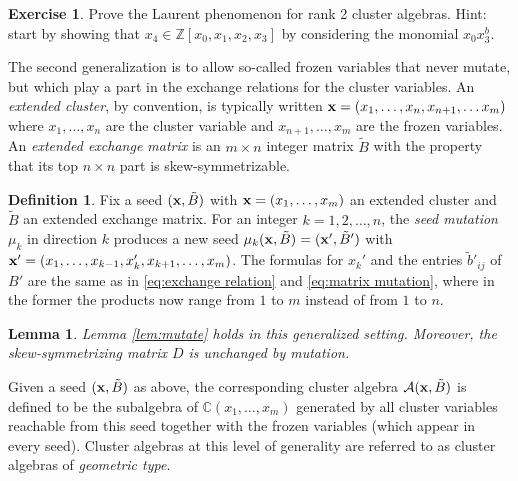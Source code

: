 \documentclass{amsart}
\newtheorem{lemma}[theorem]{Lemma}
\theoremstyle{definition}
\newtheorem{definition}[theorem]{Definition}
\newtheorem{exercise}[theorem]{Exercise}
\theoremstyle{remark}
\numberwithin{equation}{section}
\newcommand{\cA}{{\mathcal{A}}}
\newcommand{\x}{{\bf x}}
\newcommand{\CC}{{\mathbb{C}}}
\newcommand{\ZZ}{{\mathbb{Z}}}
\begin{document}
	\begin{exercise}
    Prove the Laurent phenomenon for rank 2 cluster algebras.  Hint: start by showing that $x_4\in\ZZ[x_0,x_1,x_2,x_3]$ by considering the monomial $x_0x_3^b$.
  \end{exercise}
	
	The second generalization is to allow so-called frozen variables that never mutate, but which play a part in the exchange relations for the cluster variables. An \emph{extended cluster}, by convention, is typically written $\x = (x_1,\ldots, x_n, x_{n+1},\ldots x_m)$ where $x_1,\ldots, x_n$ are the cluster variable and $x_{n+1},\ldots, x_m$ are the frozen variables.  An \emph{extended exchange matrix} is an $m \times n$ integer matrix $\tilde{B}$ with the property that its top $n \times n$ part is skew-symmetrizable.
	
	\begin{definition}
	Fix a seed $(\x, \tilde B)$ with $\x=(x_1,\ldots, x_m)$ an extended cluster and $\tilde{B}$ an extended exchange matrix.  For an integer $k = 1,2,\ldots, n$, the \emph{seed mutation} $\mu_k$ in direction $k$ produces a new seed $\mu_k(\x,\tilde{B}) = (\x',\tilde{B}')$ with $\x' = (x_1,\ldots, x_{k-1}, x_k', x_{k+1},\ldots, x_m)$.  The formulas for $x_k'$ and the entries $\tilde{b}'_{ij}$ of $B'$ are the same as in \eqref{eq:exchange relation} and \eqref{eq:matrix mutation}, where in the former the products now range from $1$ to $m$ instead of from $1$ to $n$.
	\end{definition}
	
	\begin{lemma}
	Lemma \ref{lem:mutate} holds in this generalized setting.  Moreover, the skew-symmetrizing matrix $D$ is unchanged by mutation.
	\end{lemma}
	
	Given a seed $(\x, \tilde{B})$ as above, the corresponding cluster algebra $\cA(\x, \tilde{B})$ is defined to be the subalgebra of $\CC(x_1,\ldots, x_m)$ generated by all cluster variables reachable from this seed together with the frozen variables (which appear in every seed).  Cluster algebras at this level of generality are referred to as cluster algebras of \emph{geometric type}.
	
\end{document}

